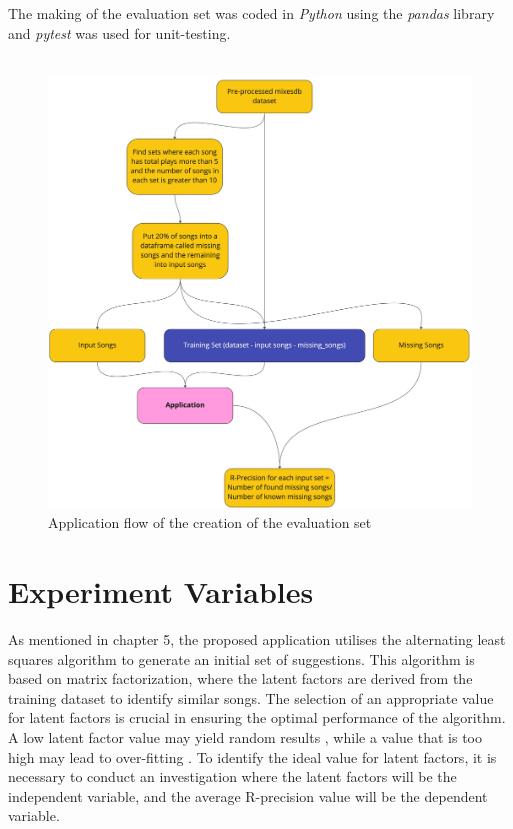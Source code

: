 The making of the evaluation set was coded in \textit{Python} using the \textit{pandas} library and \textit{pytest} was used for unit-testing.
\\
\\
\begin{figure}[H]
	\includegraphics[scale=0.1]{images/evaluation_set_app_flow}
	\centering
	\caption{Application flow of the creation of the evaluation set} 
\end{figure}

\section{Experiment Variables}

As mentioned in chapter 5, the proposed application utilises the alternating least squares algorithm to generate an initial set of suggestions. This algorithm is based on matrix factorization, where the latent factors are derived from the training dataset to identify similar songs. The selection of an appropriate value for latent factors is crucial in ensuring the optimal performance of the algorithm. A low latent factor value may yield random results , while a value that is too high may lead to over-fitting \citep{zhou_large-scale_2008}. To identify the ideal value for latent factors, it is necessary to conduct an  investigation where the latent factors will be the independent variable, and the average R-precision value will be the dependent variable. 

